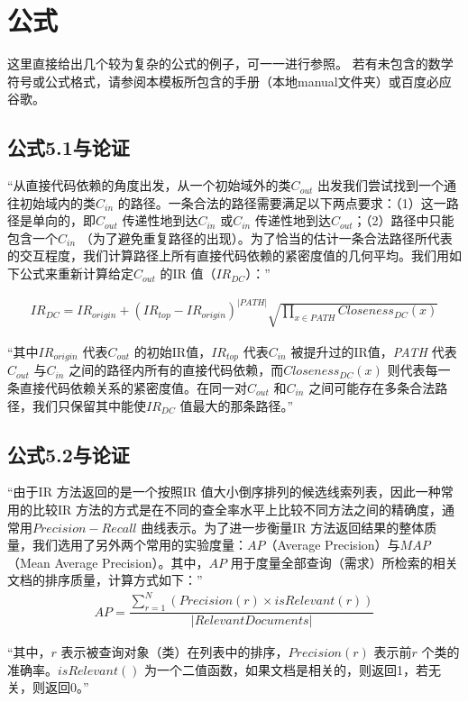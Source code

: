 \chapter{公式}

这里直接给出几个较为复杂的公式的例子，可一一进行参照。
若有未包含的数学符号或公式格式，请参阅本模板所包含的手册（本地manual文件夹）或百度必应谷歌。

\section{公式5.1与论证}
“从直接代码依赖的角度出发，从一个初始域外的类$C_{out}$ 出发我们尝试找到一个通往初始域内的类$C_{in}$ 的路径。一条合法的路径需要满足以下两点要求：（1）这一路径是单向的，即$C_{out}$ 传递性地到达$C_{in}$ 或$C_{in}$ 传递性地到达$C_{out}$；（2）路径中只能包含一个$C_{in}$ （为了避免重复路径的出现）。为了恰当的估计一条合法路径所代表的交互程度，我们计算路径上所有直接代码依赖的紧密度值的几何平均。我们用如下公式来重新计算给定$C_{out}$ 的IR 值（$IR_{DC}$）：”

\begin{align}
IR_{DC}=IR_{origin}+(IR_{top}-IR_{origin})^{\left| PATH\right|}\sqrt {\prod _{x \in PATH}Closeness_{DC}(x)} \end{align}

“其中$IR_{origin}$ 代表$C_{out}$ 的初始IR值，$IR_{top}$ 代表$C_{in}$ 被提升过的IR值，\emph{PATH} 代表$C_{out}$ 与$C_{in}$ 之间的路径内所有的直接代码依赖，而$Closeness_{DC}(x)$ 则代表每一条直接代码依赖关系的紧密度值。在同一对$C_{out}$ 和$C_{in}$ 之间可能存在多条合法路径，我们只保留其中能使$IR_{DC}$ 值最大的那条路径。”

\section{公式5.2与论证}

“由于IR 方法返回的是一个按照IR 值大小倒序排列的候选线索列表，因此一种常用的比较IR 方法的方式是在不同的查全率水平上比较不同方法之间的精确度，通常用$Precision-Recall$ 曲线表示。为了进一步衡量IR 方法返回结果的整体质量，我们选用了另外两个常用的实验度量：$AP$（Average Precision）与$MAP$ （Mean Average Precision）。其中，$AP$ 用于度量全部查询（需求）所检索的相关文档的排序质量，计算方式如下：”
\begin{align}
AP=\dfrac {\sum _{r=1}^{N}\left( Precision\left( r\right) \times isRelevant\left( r\right) \right) } {\left| RelevantDocuments\right| }
\end{align}

“其中，$r$ 表示被查询对象（类）在列表中的排序，$Precision(r)$ 表示前$r$ 个类的准确率。$isRelevant()$ 为一个二值函数，如果文档是相关的，则返回1，若无关，则返回0。”

